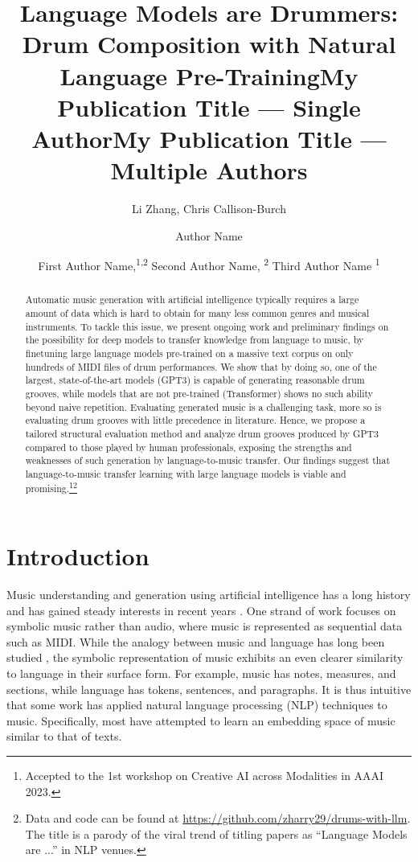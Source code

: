 \documentclass[letterpaper]{article} %
\title{Language Models are Drummers:\\Drum Composition with Natural Language Pre-Training}
\author{
Li Zhang,
Chris Callison-Burch
}
\title{My Publication Title --- Single Author}
\author {
Author Name
}
\title{My Publication Title --- Multiple Authors}
\author {
First Author Name,\textsuperscript{\rm 1,\rm 2}
Second Author Name, \textsuperscript{\rm 2}
Third Author Name \textsuperscript{\rm 1}
}
\begin{document}
\maketitle

\begin{abstract}
Automatic music generation with artificial intelligence typically requires a large amount of data which is hard to obtain for many less common genres and musical instruments. To tackle this issue, we present ongoing work and preliminary findings on the possibility for deep models to transfer knowledge from language to music, by finetuning large language models pre-trained on a massive text corpus on only hundreds of MIDI files of drum performances. We show that by doing so, one of the largest, state-of-the-art models (GPT3) is capable of generating reasonable drum grooves, while models that are not pre-trained (Transformer) shows no such ability beyond naive repetition. Evaluating generated music is a challenging task, more so is evaluating drum grooves with little precedence in literature. Hence, we propose a tailored structural evaluation method and analyze drum grooves produced by GPT3 compared to those played by human professionals, exposing the strengths and weaknesses of such generation by language-to-music transfer. Our findings suggest that language-to-music transfer learning with large language models is viable and promising.\footnote{Accepted to the 1st workshop on Creative AI across Modalities in AAAI 2023.}\footnote{Data and code can be found at \url{https://github.com/zharry29/drums-with-llm}. The title is a parody of the viral trend of titling papers as ``Language Models are ...'' in NLP venues.}
\end{abstract}

\section{Introduction}
Music understanding and generation using artificial intelligence has a long history \cite{roads1985research} and has gained steady interests in recent years \cite{kaliakatsos2020artificial}. One strand of work focuses on symbolic music rather than audio, where music is represented as sequential data such as MIDI. While the analogy between music and language has long been studied \cite{10.1525/mp.2004.21.3.289}, the symbolic representation of music exhibits an even clearer similarity to language in their surface form. For example, music has notes, measures, and sections, while language has tokens, sentences, and paragraphs. It is thus intuitive that some work has applied natural language processing (NLP) techniques to music. Specifically, most have attempted to learn an embedding space of music \cite{liang2020pirhdy} similar to that of texts.
\end{document}

